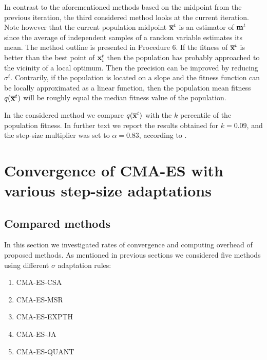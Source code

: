 \documentclass[runningheads,a4paper]{llncs}
\newcommand{\wek}[1]{
    {\bf #1} 
}
\begin{document}

In contrast to the aforementioned methods based on the midpoint from the previous iteration, the third considered method looks at the current iteration. Note however that the current population midpoint $\overline{\wek{x}}^t$ is an estimator of $\wek{m}^t$ since the average of independent samples of a random variable estimates its mean. The method outline is presented in Procedure 6.
If the fitness of $\overline{\wek{x}}^t$ is better than the best point of $\wek{x}^t_i$  then the population has probably approached to the vicinity of a local optimum. Then the precision can be improved by reducing $\sigma^t$. Contrarily, if the population is located on a slope and the fitness function can be locally approximated as a linear function, then the population mean fitness $q(\overline{\wek{x}}^t)$ will be roughly equal the median fitness value of the population. 

In the considered method we compare  $q(\overline{\wek{x}}^t)$ with the $k$ percentile of the population fitness. In further text we report the results obtained for $k=0.09$, and the step-size multiplier was set to $\alpha=0.83$, according to \cite{Schwefel95}.




\section{Convergence of CMA-ES with various step-size adaptations}
\subsection{Compared methods}

In this section we investigated rates of convergence and computing overhead of proposed methods. 
As mentioned in previous sections we considered five methods using different $\sigma$ adaptation rules:
  \begin{enumerate}
    \item CMA-ES-CSA
    \item CMA-ES-MSR
    \item CMA-ES-EXPTH
    \item CMA-ES-JA
    \item CMA-ES-QUANT
  \end{enumerate}
\end{document}
